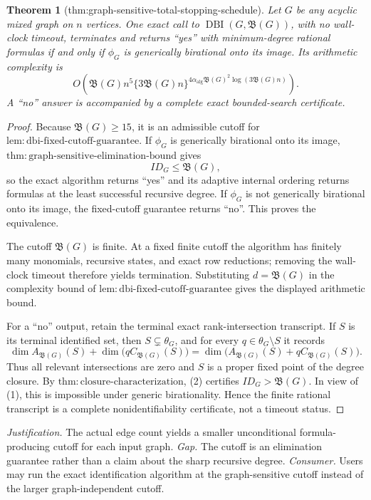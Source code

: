 \documentclass{article}
\newtheorem{theorem}{Theorem}
\begin{document}
\begin{theorem}[thm:graph-sensitive-total-stopping-schedule]\label{thm:graph-sensitive-total-stopping-schedule}
Let \(G\) be any acyclic mixed graph on \(n\) vertices.  One exact call to \(\operatorname{DBI}(G,\mathfrak B(G))\), with no wall-clock timeout, terminates and returns ``yes'' with minimum-degree rational formulas if and only if \(\phi_G\) is generically birational onto its image.  Its arithmetic complexity is
\[
 O\!\left(
 \mathfrak B(G)n^5
 \{3\mathfrak B(G)n\}^{4\alpha_{\mathrm{alg}}\mathfrak B(G)^2\log(3\mathfrak B(G)n)}
 \right).
\]
A ``no'' answer is accompanied by a complete exact bounded-search certificate.
\end{theorem}
\begin{proof}
Because \(\mathfrak B(G)\geq15\), it is an admissible cutoff for \(\mathrm{lem:dbi\mbox{-}fixed\mbox{-}cutoff\mbox{-}guarantee}\).  If \(\phi_G\) is generically birational onto its image, \(\mathrm{thm:graph\mbox{-}sensitive\mbox{-}elimination\mbox{-}bound}\) gives
\[
 ID_G\leq\mathfrak B(G),
 \tag{1}
\]
so the exact algorithm returns ``yes'' and its adaptive internal ordering returns formulas at the least successful recursive degree.  If \(\phi_G\) is not generically birational onto its image, the fixed-cutoff guarantee returns ``no''.  This proves the equivalence.

The cutoff \(\mathfrak B(G)\) is finite.  At a fixed finite cutoff the algorithm has finitely many monomials, recursive states, and exact row reductions; removing the wall-clock timeout therefore yields termination.  Substituting \(d=\mathfrak B(G)\) in the complexity bound of \(\mathrm{lem:dbi\mbox{-}fixed\mbox{-}cutoff\mbox{-}guarantee}\) gives the displayed arithmetic bound.

For a ``no'' output, retain the terminal exact rank-intersection transcript.  If \(S\) is its terminal identified set, then \(S\subsetneq\theta_G\), and for every \(q\in\theta_G\setminus S\) it records
\[
 \dim A_{\mathfrak B(G)}(S)
 +\dim\bigl(qC_{\mathfrak B(G)}(S)\bigr)
 =\dim\bigl(A_{\mathfrak B(G)}(S)+qC_{\mathfrak B(G)}(S)\bigr).
 \tag{2}
\]
Thus all relevant intersections are zero and \(S\) is a proper fixed point of the degree closure.  By \(\mathrm{thm:closure\mbox{-}characterization}\), (2) certifies \(ID_G>\mathfrak B(G)\).  In view of (1), this is impossible under generic birationality.  Hence the finite rational transcript is a complete nonidentifiability certificate, not a timeout status.
\end{proof}
\par\smallskip\noindent \textit{Justification.} The actual edge count yields a smaller unconditional formula-producing cutoff for each input graph. \textit{Gap.} The cutoff is an elimination guarantee rather than a claim about the sharp recursive degree. \textit{Consumer.} Users may run the exact identification algorithm at the graph-sensitive cutoff instead of the larger graph-independent cutoff.
\end{document}
